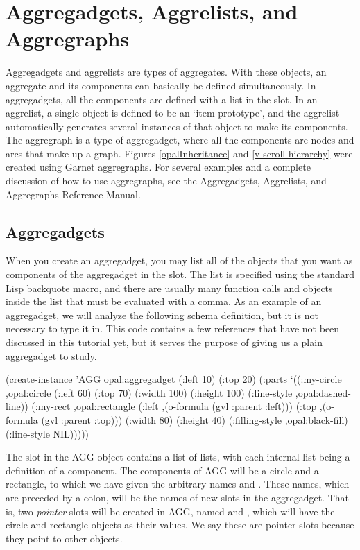 \section{Aggregadgets, Aggrelists, and Aggregraphs}
\label{aggregadgets}

Aggregadgets and aggrelists are types of aggregates.  With these
objects, an aggregate and its components can basically be defined
simultaneously.  In aggregadgets, all the components are defined
with a list in the  slot.  In an aggrelist, a single object
is defined to be an `item-prototype', and the aggrelist automatically
generates several instances of that object to make its components.
The aggregraph is a type of aggregadget, where all the components are
nodes and arcs that make up a graph.  Figures \ref{opalInheritance}
and \ref{v-scroll-hierarchy} were created using Garnet aggregraphs.
For several examples and a complete discussion of how to use
aggregraphs, see the Aggregadgets, Aggrelists, and Aggregraphs
Reference Manual.


\subsection{Aggregadgets}

When you create an aggregadget, you may list all of the objects that
you want as components of the aggregadget in the  slot.
The list is specified using the standard Lisp backquote macro, and
there are usually many function calls and objects inside the list that
must be evaluated with a comma.  As an example of an aggregadget, we
will analyze the following schema definition, but it is not necessary
to type it in.  This code contains a few references that have not been
discussed in this tutorial yet, but it serves the purpose of giving us
a plain aggregadget to study.

\begin{programexample}
(create-instance 'AGG opal:aggregadget
   (:left 10) (:top 20)
   (:parts
    `((:my-circle ,opal:circle
                  (:left 60) (:top 70)
                  (:width 100) (:height 100)
                  (:line-style ,opal:dashed-line))
      (:my-rect ,opal:rectangle
                (:left ,(o-formula (gvl :parent :left)))
                (:top ,(o-formula (gvl :parent :top)))
                (:width 80) (:height 40)
                (:filling-style ,opal:black-fill)
                (:line-style NIL)))))
\end{programexample}

The  slot in the AGG object contains
a list of lists, with each internal list being a definition of a component.
The components of AGG will be a circle and a rectangle, to which we
have given the arbitrary names  and .
These names, which are preceded by a colon, will be the names of new
slots in the aggregadget.  That is, two {\it pointer} slots will be
created in AGG, named  and , which will
have the circle and rectangle objects as their values.  We say these are
pointer slots because they point to other objects.

